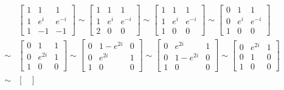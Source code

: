 \documentclass[12pt]{article}
\begin{document}
{\begin{enumerate}[label=(\alph*)]
        \begin{align*}
          &\begin{bmatrix}
            1 & 1 & 1 \\
            1 & e^i & e^{-i} \\
            1 & -1 & -1
          \end{bmatrix}
          \sim
          \begin{bmatrix}
            1 & 1 & 1 \\
            1 & e^i & e^{-i} \\
            2 & 0 & 0
          \end{bmatrix}
          \sim
          \begin{bmatrix}
            1 & 1 & 1 \\
            1 & e^i & e^{-i} \\
            1 & 0 & 0
          \end{bmatrix}
          \sim
          \begin{bmatrix}
            0 & 1 & 1 \\
            0 & e^i & e^{-i} \\
            1 & 0 & 0
          \end{bmatrix} \\
          \sim
          &\begin{bmatrix}
            0 & 1 & 1 \\
            0 & e^{2i} & 1 \\
            1 & 0 & 0
          \end{bmatrix}
          \sim
          \begin{bmatrix}
            0 & 1 - e^{2i} & 0 \\
            0 & e^{2i} & 1 \\
            1 & 0 & 0
          \end{bmatrix}
          \sim
          \begin{bmatrix}
            0 & e^{2i} & 1 \\
            0 & 1 - e^{2i} & 0 \\
            1 & 0 & 0
          \end{bmatrix}
          \sim
          \begin{bmatrix}
            0 & e^{2i} & 1 \\
            0 & 1 & 0 \\
            1 & 0 & 0
          \end{bmatrix} \\
          \sim
          &\begin{bmatrix}

\end{bmatrix}
\end{align*}
\end{enumerate}}
\end{document}
